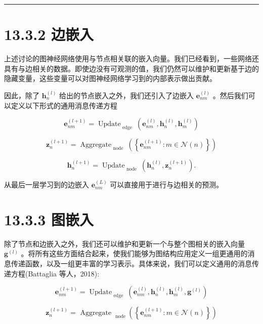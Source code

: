 \documentclass[10pt]{article}
\newcommand{\HRule}{\begin{center}\rule{0.9\linewidth}{0.2mm}\end{center}}
\begin{document}
\HRule

\section*{13.3.2 边嵌入}

上述讨论的图神经网络使用与节点相关联的嵌入向量。我们已经看到，一些网络还具有与边相关的数据。即使边没有可观测的值，我们仍然可以维护和更新基于边的隐藏变量，这些变量可以对图神经网络学习到的内部表示做出贡献。

因此，除了 \({\mathbf{h}}_{n}^{\left( l\right) }\) 给出的节点嵌入之外，我们还引入了边嵌入 \({\mathbf{e}}_{nm}^{\left( l\right) }\) 。然后我们可以定义以下形式的通用消息传递方程

\[
{\mathbf{e}}_{nm}^{\left( l + 1\right) } = {\operatorname{Update}}_{\text{ edge }}\left( {{\mathbf{e}}_{nm}^{\left( l\right) },{\mathbf{h}}_{n}^{\left( l\right) },{\mathbf{h}}_{m}^{\left( l\right) }}\right)  \tag{13.29}
\]

\[
{\mathbf{z}}_{n}^{\left( l + 1\right) } = {\operatorname{Aggregate}}_{\text{ node }}\left( \left\{  {{\mathbf{e}}_{nm}^{\left( l + 1\right) } : m \in  \mathcal{N}\left( n\right) }\right\}  \right)  \tag{13.30}
\]

\[
{\mathbf{h}}_{n}^{\left( l + 1\right) } = {\operatorname{Update}}_{\text{ node }}\left( {{\mathbf{h}}_{n}^{\left( l\right) },{\mathbf{z}}_{n}^{\left( l + 1\right) }}\right) . \tag{13.31}
\]

从最后一层学习到的边嵌入 \({\mathbf{e}}_{nm}^{\left( L\right) }\) 可以直接用于进行与边相关的预测。

\section*{13.3.3 图嵌入}

除了节点和边嵌入之外，我们还可以维护和更新一个与整个图相关的嵌入向量 \({\mathbf{g}}^{\left( l\right) }\) 。将所有这些方面结合起来，使我们能够为图结构应用定义一组更通用的消息传递函数，以及一组更丰富的学习表示。具体来说，我们可以定义通用的消息传递方程(Battaglia 等人，2018):

\[
{\mathbf{e}}_{nm}^{\left( l + 1\right) } = {\operatorname{Update}}_{\text{ edge }}\left( {{\mathbf{e}}_{nm}^{\left( l\right) },{\mathbf{h}}_{n}^{\left( l\right) },{\mathbf{h}}_{m}^{\left( l\right) },{\mathbf{g}}^{\left( l\right) }}\right)  \tag{13.32}
\]

\[
{\mathbf{z}}_{n}^{\left( l + 1\right) } = {\text{ Aggregate }}_{\text{ node }}\left( \left\{  {{\mathbf{e}}_{nm}^{\left( l + 1\right) } : m \in  \mathcal{N}\left( n\right) }\right\}  \right)  \tag{13.33}
\]
\end{document}
